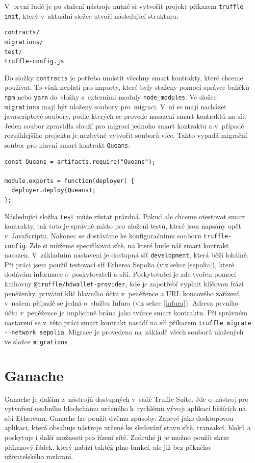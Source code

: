 V~první řadě je po stažení nástroje nutné si vytvořit projekt příkazem \texttt{truffle init}, který v~aktuální složce utvoří následující strukturu:
\begin{verbatim}
contracts/
migrations/
test/
truffle-config.js
\end{verbatim}
Do složky \texttt{contracts} je potřeba umístit všechny smart kontrakty, které chceme používat. To však neplatí pro importy, které byly staženy pomocí správce balíčků \texttt{npm} nebo \texttt{yarn} do~složky s~externími moduly \texttt{node\_modules}. Ve složce \texttt{migrations} mají být uloženy soubory pro~migraci. V~ní se mají nacházet javascriptové soubory, podle kterých se provede nasazení smart kontraktů na síť. Jeden soubor zpravidla slouží pro migraci jednoho smart kontraktu a v~případě rozsáhlejšího projektu je nezbytné vytvořit souborů více. Takto vypadá migrační soubor pro hlavní smart kontrakt \texttt{Queans}:

\begin{verbatim}
const Queans = artifacts.require("Queans");

module.exports = function(deployer) {
  deployer.deploy(Queans);
};
\end{verbatim}

Následující složka \texttt{test} může zůstat prázdná. Pokud ale chceme otestovat smart kontrakty, tak toto je správné místo pro uložení testů, které jsou napsány opět v~JavaScriptu. Nakonec se dostáváme ke konfiguračnímu souboru \texttt{truffle-config}. Zde si můžeme specifikovat sítě, na které bude náš smart kontrakt nasazen. V~základním nastavení je dostupná síť \texttt{development}, která běží lokálně. Při práci jsem použil testovací síť Etherea Sepolia (viz sekce \ref{sepolia}), které dodávám informace o~poskytovateli a síti. Poskytovatel je zde tvořen pomocí knihovny \texttt{@truffle/hdwallet-provider}, kde je zapotřebí vyplnit klíčovou frázi peněženky, privátní klíč hlavního účtu v~peněžence a URL koncového zařízení, v~našem případě se jedná o~službu Infura (viz sekce \ref{infura}). Adresa prvního účtu v~peněžence je implicitně brána jako tvůrce smart kontraktu. Při správném nastavení se v~této práci smart kontrakt nasadí na síť příkazem \texttt{truffle migrate -{}-network sepolia}. Migrace je provedena na~základě všech souborů uložených ve složce \texttt{migrations} \cite{truffle}.

\section{Ganache}
Ganache je dalším z~nástrojů dostupných v~sadě Truffle Suite. Jde o~nástroj pro vytvoření osobního blockchainu určeného k~rychlému vývoji aplikací běžících na síti Ethereum. Ganache lze použít dvěma způsoby. Zaprvé jako desktopovou aplikaci, která obsahuje nástroje určené ke sledování stavu sítě, transakcí, bloků a poskytuje i další možnosti pro řízení sítě. Zadruhé ji je možno použít skrze příkazový řádek, který nabízí taktéž plno funkcí, ale již bez pěkného uživatelského rozhraní. 

